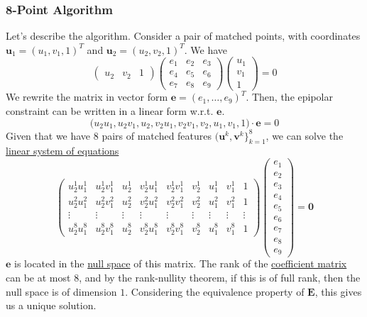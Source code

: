 \documentclass{article}
\newcounter{theorem}[section]
\newcounter{algo}[section]
\begin{document}
  \subsubsection{8-Point Algorithm}

  Let's describe the algorithm. Consider a pair of matched points, with coordinates $\mathbf{u}_1 = (u_1, v_1, 1)^T$ and $\mathbf{u}_2 = (u_2, v_2, 1)^T$. We have 
  \begin{equation}
    \begin{pmatrix} u_2 & v_2 & 1 \end{pmatrix} \begin{pmatrix} e_1 & e_2 & e_3 \\ e_4 & e_5 & e_6 \\ e_7 & e_8 & e_9 \end{pmatrix} \begin{pmatrix} u_1 \\ v_1 \\ 1 \end{pmatrix} = 0
  \end{equation}
  We rewrite the matrix in vector form $\mathbf{e} = (e_1, \ldots, e_9)^T$. Then, the epipolar constraint can be written in a linear form w.r.t. $\mathbf{e}$. 
  \begin{equation}
    \big( u_2 u_1 , u_2 v_1 , u_2 , v_2 u_1, v_2 v_1, v_2, u_1, v_1, 1 \big) \cdot \mathbf{e} = 0
  \end{equation}
  Given that we have $8$ pairs of matched features $(\mathbf{u}^k, \mathbf{v}^k\}_{k=1}^8$, we can solve the \hyperref[lin-def:linear-system-of-equations]{linear system of equations}
  \begin{equation}
    \begin{pmatrix}
      u_2^1 u_1^1 & u_2^1 v_1^1 & u_2^1 & v_2^1 u_1^1 & v_2^1 v_1^1 & v_2^1 & u_1^1 & v_1^1 & 1 \\
      u_2^2 u_1^2 & u_2^2 v_1^2 & u_2^2 & v_2^2 u_1^2 & v_2^2 v_1^2 & v_2^2 & u_1^2 & v_1^2 & 1 \\
      \vdots & \vdots & \vdots & \vdots & \vdots & \vdots & \vdots & \vdots & \vdots \\
      u_2^8 u_1^8 & u_2^8 v_1^8 & u_2^8 & v_2^8 u_1^8 & v_2^8 v_1^8 & v_2^8 & u_1^8 & v_1^8 & 1 \end{pmatrix} \begin{pmatrix} e_1 \\ e_2 \\ e_3 \\ e_4 \\ e_5 \\ e_6 \\ e_7 \\ e_8 \\ e_9 \end{pmatrix} = \mathbf{0}
  \end{equation}
  $\mathbf{e}$ is located in the \hyperref[lin-def:null-space]{null space} of this matrix. The rank of the \hyperref[lin-def:coefficient-matrix]{coefficient matrix} can be at most $8$, and by the rank-nullity theorem, if this is of full rank, then the null space is of dimension $1$. Considering the equivalence property of $\mathbf{E}$, this gives us a unique solution. 
\end{document}
